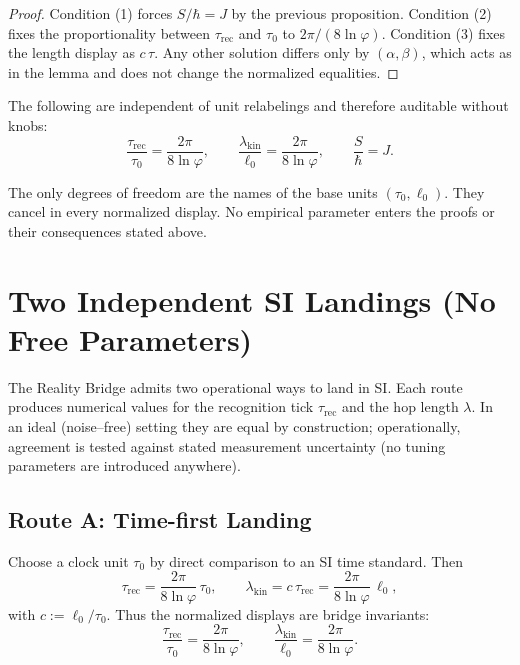 \documentclass[11pt]{article}
\begin{document}
\begin{proof}
Condition (1) forces \(S/\hbar=J\) by the previous proposition. Condition (2) fixes the proportionality between \(\tau_{\mathrm{rec}}\) and \(\tau_{0}\) to \(2\pi/(8\ln\varphi)\). Condition (3) fixes the length display as \(c\,\tau\). Any other solution differs only by \((\alpha,\beta)\), which acts as in the lemma and does not change the normalized equalities.
\end{proof}

\begin{corollary}
The following are independent of unit relabelings and therefore auditable without knobs:
\[
\frac{\tau_{\mathrm{rec}}}{\tau_{0}}=\frac{2\pi}{8\ln\varphi},\qquad
\frac{\lambda_{\mathrm{kin}}}{\ell_{0}}=\frac{2\pi}{8\ln\varphi},\qquad
\frac{S}{\hbar}=J.
\]
\end{corollary}

\begin{remark}[No knobs]
The only degrees of freedom are the names of the base units \((\tau_{0},\ell_{0})\). They cancel in every normalized display. No empirical parameter enters the proofs or their consequences stated above.
\end{remark}

\section{Two Independent SI Landings (No Free Parameters)}
The Reality Bridge admits two operational ways to land in SI. Each route produces numerical values for the recognition tick \(\tau_{\mathrm{rec}}\) and the hop length \(\lambda\). In an ideal (noise–free) setting they are equal by construction; operationally, agreement is tested against stated measurement uncertainty (no tuning parameters are introduced anywhere).

\subsection*{Route A: Time-first Landing}
Choose a clock unit \(\tau_{0}\) by direct comparison to an SI time standard. Then
\[
\tau_{\mathrm{rec}}=\frac{2\pi}{8\ln\varphi}\,\tau_{0},
\qquad
\lambda_{\mathrm{kin}}=c\,\tau_{\mathrm{rec}}=\frac{2\pi}{8\ln\varphi}\,\ell_{0},
\]
with \(c:=\ell_{0}/\tau_{0}\). Thus the normalized displays are bridge invariants:
\[
\frac{\tau_{\mathrm{rec}}}{\tau_{0}}=\frac{2\pi}{8\ln\varphi},
\qquad
\frac{\lambda_{\mathrm{kin}}}{\ell_{0}}=\frac{2\pi}{8\ln\varphi}.
\]
\end{document}
